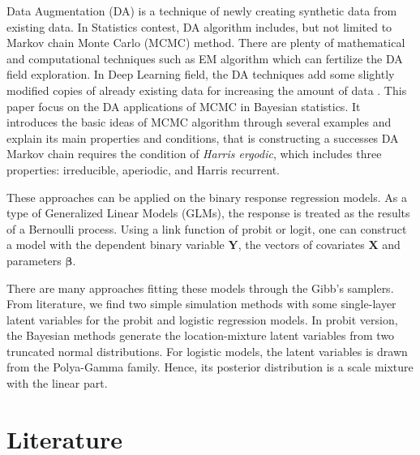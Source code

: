 \documentclass[12pt]{article}
\begin{document}
Data Augmentation (DA) is a technique of newly creating synthetic data
from existing data. In Statistics contest, DA algorithm includes, but
not limited to Markov chain Monte Carlo (MCMC) method. There are plenty
of mathematical and computational techniques such as EM algorithm which
can fertilize the DA field exploration. In Deep Learning field, the DA
techniques add some slightly modified copies of already existing data
for increasing the amount of data \citep{shortenSurveyImageData2019}.
This paper focus on the DA applications of MCMC in Bayesian statistics.
It introduces the basic ideas of MCMC algorithm through several examples
and explain its main properties and conditions, that is constructing a
successes DA Markov chain requires the condition of \emph{Harris
ergodic}, which includes three properties: irreducible, aperiodic, and
Harris recurrent.

These approaches can be applied on the binary response regression
models. As a type of Generalized Linear Models (GLMs), the response is
treated as the results of a Bernoulli process. Using a link function of
probit or logit, one can construct a model with the dependent binary
variable \(\mathbf{Y}\), the vectors of covariates \(\mathbf{X}\) and
parameters \(\boldsymbol{\beta}\).

There are many approaches fitting these models through the Gibb's
samplers. From literature, we find two simple simulation methods with
some single-layer latent variables for the probit and logistic
regression models. In probit version, the Bayesian methods generate the
location-mixture latent variables from two truncated normal
distributions. For logistic models, the latent variables is drawn from
the Polya-Gamma family. Hence, its posterior distribution is a scale
mixture with the linear part.

\hypertarget{literature}{%
\section{Literature}\label{literature}}
\end{document}
